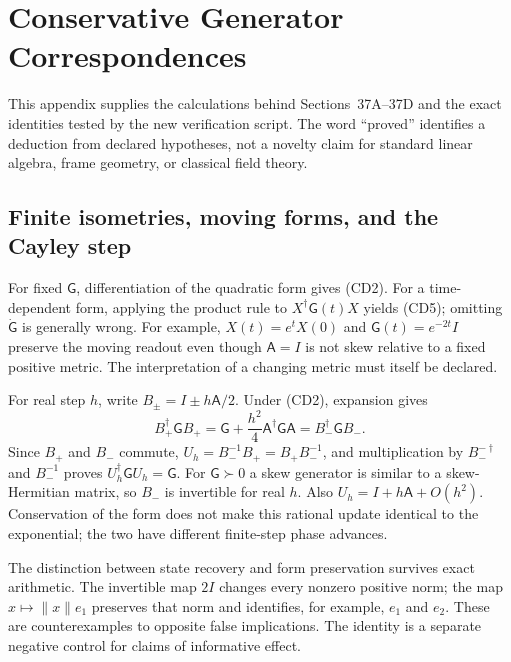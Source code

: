 \section{Conservative Generator Correspondences}\label{app:conservativecalculations}
This appendix supplies the calculations behind Sections~37A--37D and the exact identities tested by the new verification script. The word ``proved'' identifies a deduction from declared hypotheses, not a novelty claim for standard linear algebra, frame geometry, or classical field theory.

\subsection{Finite isometries, moving forms, and the Cayley step}
For fixed $\mathsf G$, differentiation of the quadratic form gives (CD2). For a time-dependent form, applying the product rule to $X^\dagger\mathsf G(t)X$ yields (CD5); omitting $\dot{\mathsf G}$ is generally wrong. For example, $X(t)=e^tX(0)$ and $\mathsf G(t)=e^{-2t}I$ preserve the moving readout even though $\mathsf A=I$ is not skew relative to a fixed positive metric. The interpretation of a changing metric must itself be declared.

For real step $h$, write $B_\pm=I\pm h\mathsf A/2$. Under (CD2), expansion gives
\[
B_+^\dagger\mathsf G B_+
=\mathsf G+\frac{h^2}{4}\mathsf A^\dagger\mathsf G\mathsf A
=B_-^\dagger\mathsf G B_-.
\]
Since $B_+$ and $B_-$ commute, $U_h=B_-^{-1}B_+=B_+B_-^{-1}$, and multiplication by $B_-^{-\dagger}$ and $B_-^{-1}$ proves $U_h^\dagger\mathsf G U_h=\mathsf G$. For $\mathsf G\succ0$ a skew generator is similar to a skew-Hermitian matrix, so $B_-$ is invertible for real $h$. Also $U_h=I+h\mathsf A+O(h^2)$. Conservation of the form does not make this rational update identical to the exponential; the two have different finite-step phase advances.

The distinction between state recovery and form preservation survives exact arithmetic. The invertible map $2I$ changes every nonzero positive norm; the map $x\mapsto\|x\|e_1$ preserves that norm and identifies, for example, $e_1$ and $e_2$. These are counterexamples to opposite false implications. The identity is a separate negative control for claims of informative effect.

